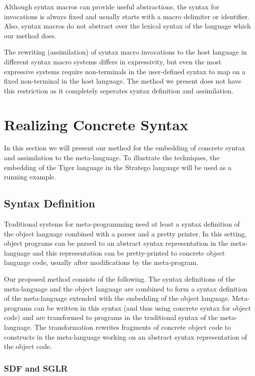 \documentclass[a4paper,11pt]{article}
\begin{document}
Although syntax macros can provide useful abstractions, the syntax for
invocations is always fixed and usually starts with a macro delimiter or
identifier. Also, syntax macros do not abstract over the lexical syntax
of the language which our method does.

The rewriting (assimilation) of syntax macro invocations to the host
language in different syntax macro systems differs in expressivity, but
even the most expressive systems \cite{Weis93, Sha96} require non-terminals in the user-defined
syntax to map on a fixed non-terminal in the host language. The method
we present does not have this restriction as it completely seperates syntax
definition and assimilation.


\section{Realizing Concrete Syntax}\label{sec:realization}

In this section we will present our method for the embedding of concrete
syntax and assimilation to the meta-language. To illustrate the techniques,
the embedding of the Tiger language in the Stratego language will be used
as a running example.


\subsection{Syntax Definition}

Traditional systems for meta-programming need at least a syntax definition
of the object language combined with a parser and a pretty printer. In this
setting, object programs can be parsed to an abstract syntax representation
in the meta-language and this representation can be pretty-printed to
concrete object language code, usually after modifications by the meta-program.

Our proposed method consists of the following. The syntax definitions of the
meta-language and the object language are combined to form a syntax definition
of the meta-language extended with the embedding of the object language.
Meta-programs can be written in this syntax (and thus using concrete syntax
for object code) and are transformed to programs in the traditional syntax of
the meta-language. The transformation rewrites fragments of concrete object
code to constructs in the meta-language working on an abstract syntax representation
of the object code.

\subsubsection*{SDF and SGLR}
\end{document}
